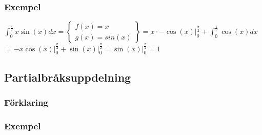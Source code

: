 \documentclass{article}
\begin{document}
\subsubsection{Exempel}
${\displaystyle \int_{0}^{\frac{\pi}{2}}x\sin(x)dx=\left\{\begin{array}{l}
   f(x)=x   \\
   g(x)=sin(x)
\end{array}
\right\} = x \cdot-\cos(x)\bigg\vert_{0}^{\frac{\pi}{2}} + \int_{0}^{\frac{\pi}{2}}\cos(x)dx}$ \\
$= -x\cos(x)\bigg\vert_{0}^{\frac{\pi}{2}} + \sin(x)\bigg\vert_{0}^{\frac{\pi}{2}} = \sin(x)\bigg\vert_{0}^{\frac{\pi}{2}}=1$

\subsection{Partialbråksuppdelning}
\subsubsection{Förklaring}
\subsubsection{Exempel}
\end{document}
